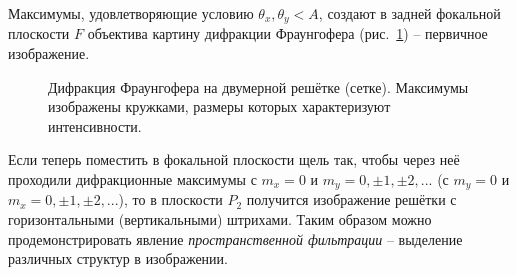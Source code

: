 \documentclass[a4paper,12pt]{article} %
\begin{document}
	Максимумы, удовлетворяющие условию $\theta_x, \theta_y < A$, создают в задней фокальной плоскости $F$ объектива картину дифракции Фраунгофера (рис.~\ref{ris:max}) -- первичное изображение.
	\begin{figure}[H]
		\caption{Дифракция Фраунгофера на двумерной решётке (сетке). Максимумы изображены кружками, размеры которых характеризуют интенсивности.}
		\label{ris:max}
	\end{figure}
	
	Если теперь поместить в фокальной плоскости щель так, чтобы через неё проходили дифракционные максимумы с $m_x = 0$ и $m_y =0, \pm 1, \pm 2, ...$ (с $m_y = 0$ и $m_x =0, \pm 1, \pm 2, ...$), то в плоскости $P_2$ получится изображение решётки с горизонтальными (вертикальными) штрихами. Таким образом можно продемонстрировать явление \textit{пространственной фильтрации} -- выделение различных структур в изображении.
	\newpage
\end{document}
